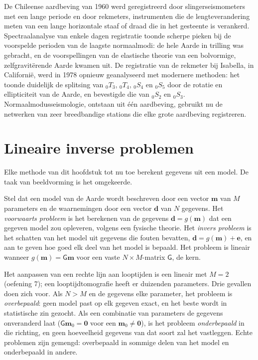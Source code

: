 \begin{history}
De Chileense aardbeving van 1960 werd geregistreerd door slingerseismometers met een lange periode
en door rekmeters, instrumenten die de lengteverandering meten van een
lange horizontale staaf of draad die in het gesteente is verankerd. Spectraalanalyse van enkele dagen
registratie toonde scherpe pieken bij de voorspelde perioden van de laagste normaalmodi: de
hele Aarde in trilling was gebracht, en de voorspellingen van de elastische theorie
van een bolvormige, zelfgravitërende Aarde kwamen uit. De registratie van de rekmeter
bij Isabella, in Californië, werd in 1978 opnieuw geanalyseerd met modernere
methoden: het toonde duidelijk de splitsing van ${}_0T_3$, ${}_0T_4$, ${}_0S_4$
en ${}_0S_5$ door de rotatie en ellipticiteit van de Aarde, en bevestigde
die van ${}_0S_2$ en ${}_0S_3$.
Normaalmodusseismologie, ontstaan uit één aardbeving, gebruikt nu de netwerken van
zeer breedbandige stations die elke grote aardbeving registreren.
\end{history}

\section{Lineaire inverse problemen}\label{sec:b3:seismology-imaging:inverse}

Elke methode van dit hoofdstuk tot nu toe berekent gegevens uit een model. De taak van
beeldvorming is het omgekeerde.

\begin{definition}\label{def:b3:seismology-imaging:inverse}
Stel dat een model van de Aarde wordt beschreven door een vector $\mathbf m$ van $M$ parameters
en de waarnemingen door een vector $\mathbf d$ van $N$ gegevens. Het \emph{voorwaarts
probleem} is het berekenen van de gegevens $\mathbf d = g(\mathbf m)$
dat een gegeven model zou opleveren, volgens een fysische theorie. Het \emph{invers
probleem} is het schatten van het model uit gegevens die
fouten bevatten, $\mathbf d = g(\mathbf m) + \mathbf e$, en aan te geven hoe goed elk deel
van het model is bepaald. Het probleem is lineair wanneer $g(\mathbf m) =
\mathsf G\mathbf m$ voor een vaste $N\times M$-matrix $\mathsf G$, de kern.
\end{definition}

Het aanpassen van een rechte lijn aan looptijden is een lineair  met
$M = 2$ (oefening 7); een looptijdtomografie heeft er duizenden
parameters. Drie gevallen doen zich voor. Als $N > M$ en de gegevens elke
parameter, het probleem is \emph{overbepaald}: geen model past op elk gegeven
exact, en het beste wordt in statistische zin gezocht. Als een combinatie van
parameters de gegevens onveranderd laat ($\mathsf G\mathbf m_0 = \mathbf 0$ voor
een $\mathbf m_0 \ne \mathbf 0$), is het probleem \emph{onderbepaald} in die
richting, en geen hoeveelheid gegevens van dat soort zal het vastleggen. Echte problemen zijn
gemengd: overbepaald in sommige delen van het model en onderbepaald in
andere.


